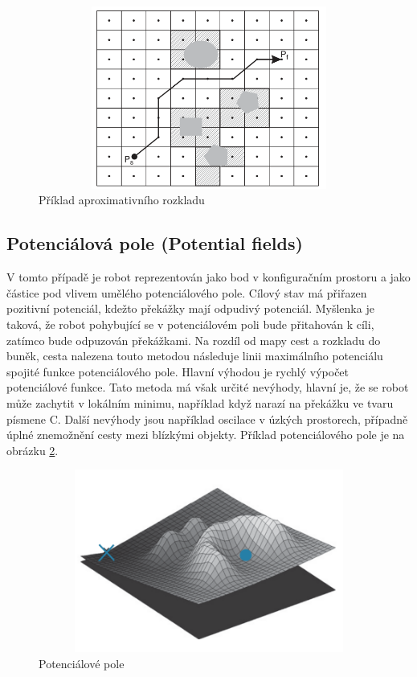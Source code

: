 \begin{enumerate}
		\begin{figure}[h!]
			\begin{center}
				\includegraphics*[width=15cm,height=6cm,keepaspectratio]{obr/aprox}
			\end{center}
			\caption{Příklad aproximativního rozkladu \cite{Tsourdos2010}}
			\label{obr:aprox}
		\end{figure}
		
	\end{enumerate}


\subsection{Potenciálová pole (Potential fields)}
V tomto případě je robot reprezentován jako bod v konfiguračním prostoru a jako částice pod vlivem umělého potenciálového pole. Cílový stav má přiřazen pozitivní potenciál, kdežto překážky mají odpudivý potenciál. Myšlenka je taková, že robot pohybující se v potenciálovém poli bude přitahován k cíli, zatímco bude odpuzován překážkami. Na rozdíl od mapy cest a rozkladu do buněk, cesta nalezena touto metodou následuje linii maximálního potenciálu spojité funkce potenciálového pole. Hlavní výhodou je rychlý výpočet potenciálové funkce. Tato metoda má však určité nevýhody, hlavní je, že se robot může zachytit v lokálním minimu, například když
narazí na překážku ve tvaru písmene C. Další nevýhody jsou například oscilace v úzkých prostorech, případně úplné znemožnění cesty mezi blízkými objekty. Příklad potenciálového pole je na obrázku \ref{obr:potential}. \cite{Tsourdos2010,Wallar2014,Masehian2004}

\begin{figure}[h!]
	\begin{center}
		\includegraphics*[width=15cm,height=6cm,keepaspectratio]{obr/potential}
	\end{center}
	\caption{Potenciálové pole \cite{Opfer20111202}}
	\label{obr:potential}
\end{figure} 

